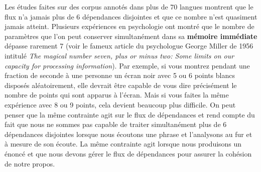 {    Les études faites sur des corpus annotés dans plus de 70 langues montrent que le flux n’a jamais plus de 6 dépendances disjointes et que ce nombre n’est quasiment jamais atteint. Plusieurs expériences en psychologie ont montré que le nombre de paramètres que l’on peut conserver simultanément dans sa \textbf{mémoire immédiate} dépasse rarement 7 (voir le fameux article du psychologue George Miller de 1956 intitulé \textit{The magical number seven, plus or minus two: Some limits on our capacity for processing information}). Par exemple, si vous montrez pendant une fraction de seconde à une personne un écran noir avec 5 ou 6 points blancs disposés aléatoirement, elle devrait être capable de vous dire précisément le nombre de points qui sont apparus à l’écran. Mais si vous faites la même expérience avec 8 ou 9 points, cela devient beaucoup plus difficile. On peut penser que la même contrainte agit sur le flux de dépendances et rend compte du fait que nous ne sommes pas capable de traiter simultanément plus de 6 dépendances disjointes lorsque nous écoutons une phrase et l’analysons au fur et à mesure de son écoute. La même contrainte agit lorsque nous produisons un énoncé et que nous devons gérer le flux de dépendances pour assurer la cohésion de notre propos.

}
